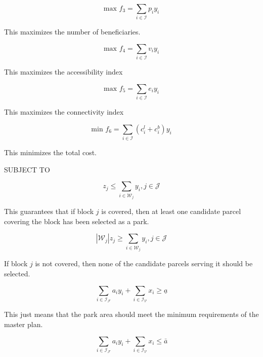 \documentclass{article}
\begin{document}
\begin{equation}
\textrm{max } f_3 = \sum_{i \in \mathcal{I}} p_iy_i
\end{equation}

This maximizes the number of beneficiaries. 

\begin{equation}
\textrm{max } f_4 = \sum_{i \in \mathcal{I}} v_iy_i
\end{equation}

This maximizes the accessibility index

\begin{equation}
\textrm{max } f_5 = \sum_{i \in \mathcal{I}} e_iy_i
\end{equation}

This maximizes the connectivity index

\begin{equation}
\textrm{min } f_6 = \sum_{i \in \mathcal{I}} (c_i^l + c_i^b)y_i
\end{equation}

This minimizes the total cost. \newline

{\large SUBJECT TO} \newline

\begin{equation}
z_j \leq \sum_{i \in \mathcal{W}_j} y_i, j \in \mathcal{J}
\end{equation}

This guarantees that if block $j$ is covered, then at least one candidate parcel covering the block has been selected as a park.

\begin{equation}
\left|\mathcal{W}_j\right|z_j \geq \sum_{i \in \mathcal{W}_j} y_i, j \in \mathcal{J}
\end{equation}

If block $j$ is not covered, then none of the candidate parcels serving it should be selected.

\begin{equation}
\sum_{i \in \mathcal{I_F}} a_iy_i + \sum_{i \in \mathcal{I_V}} x_i  \geq \underline{a}
\end{equation}

This just means that the park area should meet the minimum requirements of the master plan.

\begin{equation}
\sum_{i \in \mathcal{I_F}} a_iy_i + \sum_{i \in \mathcal{I_V}} x_i  \leq \bar{a}
\end{equation}
\end{document}
